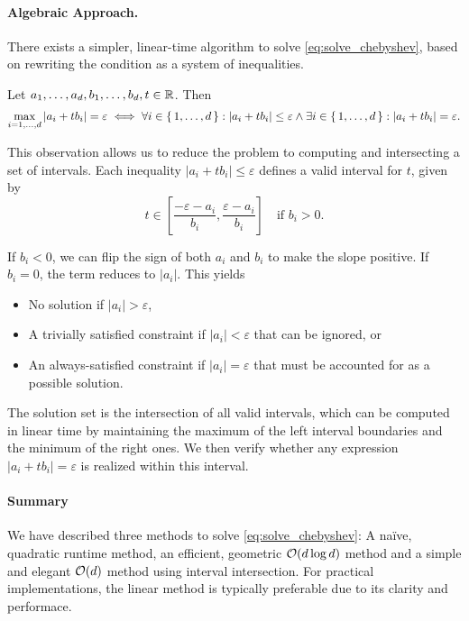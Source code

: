 \paragraph{Algebraic Approach.}
There exists a simpler, linear-time algorithm to solve \cref{eq:solve_chebyshev}, based on rewriting the condition as a system of inequalities.

\begin{observation}
	Let \(a_1, \dots, a_d, b_1, \dots, b_d, t \in \mathbb{R}\). Then
	\[\max_{i=1,\dots, d} |a_i + tb_i| = \varepsilon \iff \forall i \in \set{1,\dots, d}:  |a_i + tb_i| \leq \varepsilon \land \exists i \in \set{1,\dots, d}: |a_i + tb_i| = \varepsilon.\]
\end{observation}

This observation allows us to reduce the problem to computing and intersecting a set of intervals. Each inequality \(|a_i + tb_i| \leq \varepsilon\) defines a valid interval for \(t\), given by 
	\[t \in [\frac{-\varepsilon - a_i}{b_i}, \frac{\varepsilon - a_i}{b_i}] \quad \text{if } b_i > 0.\]

If \(b_i < 0\), we can flip the sign of both \(a_i\) and \(b_i\) to make the slope positive. If \(b_i = 0\), the term reduces to \(|a_i|\). This yields
\begin{itemize}
	\item No solution if \(|a_i| > \varepsilon\),
	\item A trivially satisfied constraint if \(|a_i| < \varepsilon\) that can be ignored, or 
	\item An always-satisfied constraint if \(|a_i| = \varepsilon\) that must be accounted for as a possible solution.
\end{itemize}

The solution set is the intersection of all valid intervals, which can be computed in linear time by maintaining the maximum of the left interval boundaries and the minimum of the right ones. We then verify whether any expression \(|a_i + tb_i| = \varepsilon\) is realized within this interval.

\paragraph{Summary}
We have described three methods to solve \cref{eq:solve_chebyshev}: A na\"ive, quadratic runtime method, an efficient, geometric \(\mathcal{O}(d\log d)\) method and a simple and elegant \(\mathcal{O}(d)\) method using interval intersection. For practical implementations, the linear method is typically preferable due to its clarity and performace.



